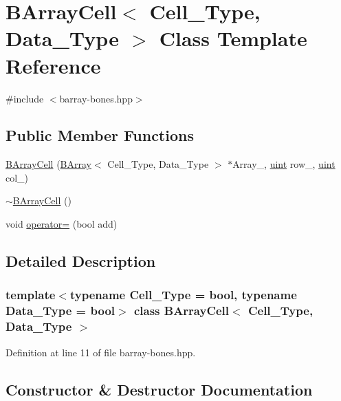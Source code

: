 \hypertarget{class_b_array_cell}{}\section{B\+Array\+Cell$<$ Cell\+\_\+\+Type, Data\+\_\+\+Type $>$ Class Template Reference}
\label{class_b_array_cell}


{\ttfamily \#include $<$barray-\/bones.\+hpp$>$}

\subsection*{Public Member Functions}
\begin{DoxyCompactItemize}
\item 
\hyperlink{class_b_array_cell_a0ebc5e7ef22511ee4a04d737b1fe056c}{B\+Array\+Cell} (\hyperlink{class_b_array}{B\+Array}$<$ Cell\+\_\+\+Type, Data\+\_\+\+Type $>$ $\ast$Array\+\_\+, \hyperlink{typedefs_8hpp_a91ad9478d81a7aaf2593e8d9c3d06a14}{uint} row\+\_\+, \hyperlink{typedefs_8hpp_a91ad9478d81a7aaf2593e8d9c3d06a14}{uint} col\+\_\+)
\item 
\hyperlink{class_b_array_cell_a6fbc56424caade490a72685cc35ad0e9}{$\sim$\+B\+Array\+Cell} ()
\item 
void \hyperlink{class_b_array_cell_a726de4e638ec37b1147d737809765953}{operator=} (bool add)
\end{DoxyCompactItemize}


\subsection{Detailed Description}
\subsubsection*{template$<$typename Cell\+\_\+\+Type = bool, typename Data\+\_\+\+Type = bool$>$\newline
class B\+Array\+Cell$<$ Cell\+\_\+\+Type, Data\+\_\+\+Type $>$}



Definition at line 11 of file barray-\/bones.\+hpp.



\subsection{Constructor \& Destructor Documentation}
\mbox{\label{class_b_array_cell_a0ebc5e7ef22511ee4a04d737b1fe056c}} 
